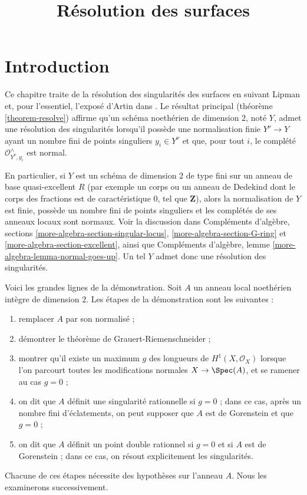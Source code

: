 

%


\title{Résolution des surfaces}


\maketitle

\label{section-phantom}

\tableofcontents

\section{Introduction} \label{section-introduction}

\noindent Ce chapitre traite de la résolution des singularités des surfaces en suivant Lipman \cite{Lipman} et, pour l'essentiel, l'exposé d'Artin dans \cite{Artin-Lipman}. Le résultat principal (théorème \ref{theorem-resolve}) affirme qu'un schéma noethérien de dimension $2$, noté $Y$, admet une résolution des singularités lorsqu'il possède une normalisation finie $Y^\nu \to Y$ ayant un nombre fini de points singuliers $y_i \in Y^\nu$ et que, pour tout $i$, le complété $\mathcal{O}_{Y^\nu, y_i}^\wedge$ est normal.

\medskip\noindent En particulier, si $Y$ est un schéma de dimension $2$ de type fini sur un anneau de base quasi-excellent $R$ (par exemple un corps ou un anneau de Dedekind dont le corps des fractions est de caractéristique $0$, tel que $\mathbf{Z}$), alors la normalisation de $Y$ est finie, possède un nombre fini de points singuliers et les complétés de ses anneaux locaux sont normaux. Voir la discussion dans Compléments d'algèbre, sections \ref{more-algebra-section-singular-locus}, \ref{more-algebra-section-G-ring} et \ref{more-algebra-section-excellent}, ainsi que Compléments d'algèbre, lemme \ref{more-algebra-lemma-normal-goes-up}. Un tel $Y$ admet donc une résolution des singularités.

\medskip\noindent Voici les grandes lignes de la démonstration. Soit $A$ un anneau local noethérien intègre de dimension $2$. Les étapes de la démonstration sont les suivantes : \begin{enumerate} \item[N] remplacer $A$ par son normalisé ; \item[V] démontrer le théorème de Grauert-Riemenschneider ; \item[B] montrer qu'il existe un maximum $g$ des longueurs de $H^1(X, \mathcal{O}_X)$ lorsque l'on parcourt toutes les modifications normales $X \to \Spec(A)$, et se ramener au cas $g = 0$ ; \item[R] on dit que $A$ définit une singularité rationnelle si $g = 0$ ; dans ce cas, après un nombre fini d'éclatements, on peut supposer que $A$ est de Gorenstein et que $g = 0$ ; \item[D] on dit que $A$ définit un point double rationnel si $g = 0$ et si $A$ est de Gorenstein ; dans ce cas, on résout explicitement les singularités. \end{enumerate} Chacune de ces étapes nécessite des hypothèses sur l'anneau $A$. Nous les examinerons successivement.

